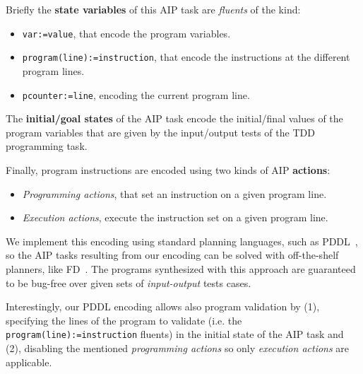 \documentclass[10pt,a4paper]{paper}
\begin{document}
Briefly the {\bf state variables} of this AIP task are {\em fluents} of the kind:
\begin{itemize}
\item {\tt var:=value}, that encode the program variables.
\item {\tt program(line):=instruction}, that encode the instructions at the different program lines.
\item {\tt pcounter:=line}, encoding the current program line.
\end {itemize}

The {\bf initial/goal states} of the AIP task encode the initial/final values of the program variables that are given by the input/output tests of the TDD programming task.

Finally, program instructions are encoded using two kinds of AIP {\bf actions}:
\begin{itemize}
\item {\it Programming actions}, that set an instruction on a given program line.
\item {\it Execution actions}, execute the instruction set on a given program line.
\end{itemize}
We implement this encoding using standard planning languages, such as PDDL~\cite{fox2003pddl2}, so the AIP tasks resulting from our encoding can be solved with off-the-shelf planners, like {\sc FD}~\cite{helmert2006fast}. The programs synthesized with this approach are guaranteed to be bug-free over given sets of {\em input-output} tests cases.

Interestingly, our PDDL encoding allows also program validation by (1), specifying the lines of the program to validate (i.e. the {\tt program(line):=instruction} fluents) in the initial state of the AIP task and (2), disabling the mentioned {\it programming actions} so only {\it execution actions} are applicable. 
\end{document}
